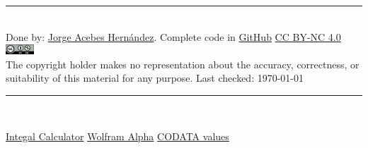 \hrule
~\\
Done by: \href{https://www.linkedin.com/in/jorge-acebes-hern%C3%A1ndez/}{Jorge Acebes Hernández}. Complete code in \href{https://github.com/JorgeAcebes/MathCheatSheet}{GitHub} 
\; \; \;\; \href{https://creativecommons.org/licenses/by-nc/4.0/}{CC BY-NC 4.0}
\;\;\;\; \includegraphics[height=1em]{sections/ccbync.png}\\
The copyright holder makes no representation about the accuracy, correctness, or suitability of
this material for any purpose. Last checked: \today
\vfill
\hrule
~\\
\begin{centering}
\href{https://www.integral-calculator.com/}{Integal Calculator} \;\;
\href{https://www.wolframalpha.com/}{Wolfram Alpha}\;\;
\href{https://physics.nist.gov/cuu/Constants/index.html}{CODATA values}

\end{centering}




